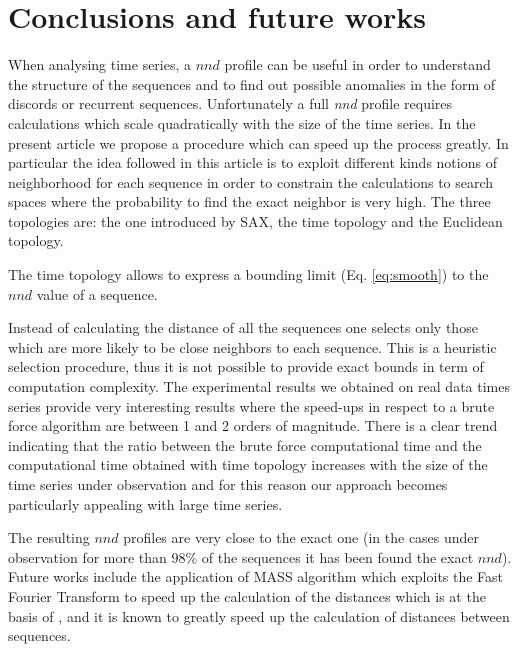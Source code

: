 \documentclass[a4paper,twoside]{article}
\begin{document}
\section{Conclusions and future works}\label{sec:conclusions}

When analysing time series, a $nnd$ profile can be useful in order to understand the structure of the sequences and to find out possible anomalies in the form of discords or recurrent sequences.
Unfortunately a full \textit{nnd} profile requires calculations which scale quadratically with the size of the time series. In the present article we propose a procedure which can speed up the process greatly. In particular the idea followed in this article is to exploit different kinds notions of neighborhood for each sequence in order to constrain the calculations to  search spaces where the probability to find the exact neighbor is very high. The three topologies are: the one introduced by SAX, the time topology and the Euclidean topology.

The time topology allows to express a bounding limit (Eq. \ref{eq:smooth}) to the $nnd$ value of a sequence.


Instead of calculating the distance of all the sequences one selects only those which are more likely to be close neighbors to each sequence. This is a heuristic selection procedure,  thus it is not possible to provide exact bounds in term of computation complexity. The experimental results we obtained on real data times series provide very interesting results where the speed-ups in respect to a brute force algorithm are between  1 and 2 orders of magnitude. There is a clear trend indicating that the ratio between the brute force computational time and the computational time obtained with time topology increases with the size of the time series under observation and for this reason our approach becomes particularly appealing with large time series. 

The resulting $nnd$ profiles are very close to the exact one (in the cases under observation for more than 98\% of the sequences  it has been found the exact $nnd$).
Future works include the application of MASS algorithm which exploits the Fast Fourier Transform to speed up the calculation of the distances \cite{mass} which is at the basis of \cite{matrix1}, and it is known to greatly speed up the calculation of distances between sequences.





{\small
}
\end{document}
